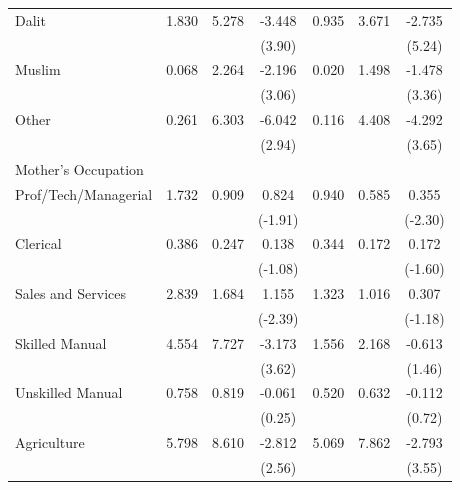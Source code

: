 \begin{longtable}{@{}l*{6}{c}@{}}
\hspace{1em}Dalit & 1.830 & 5.278 & -3.448\sym{***} & 0.935 & 3.671 & -2.735\sym{***} \\
                    &         &         & (3.90) &         &         & (5.24) \\
\hspace{1em}Muslim & 0.068 & 2.264 & -2.196\sym{***} & 0.020 & 1.498 & -1.478\sym{***} \\
                    &         &         & (3.06) &         &         & (3.36) \\
\hspace{1em}Other & 0.261 & 6.303 & -6.042\sym{***} & 0.116 & 4.408 & -4.292\sym{***} \\
                    &         &         & (2.94) &         &         & (3.65) \\
\multicolumn{7}{l}{Mother's Occupation} \\
\hspace{1em}Prof/Tech/Managerial & 1.732 & 0.909 & 0.824\sym{*} & 0.940 & 0.585 & 0.355\sym{**} \\
                    &         &         & (-1.91) &         &         & (-2.30) \\
\hspace{1em}Clerical & 0.386 & 0.247 & 0.138 & 0.344 & 0.172 & 0.172 \\
                    &         &         & (-1.08) &         &         & (-1.60) \\
\hspace{1em}Sales and Services & 2.839 & 1.684 & 1.155\sym{**} & 1.323 & 1.016 & 0.307 \\
                    &         &         & (-2.39) &         &         & (-1.18) \\
\hspace{1em}Skilled Manual & 4.554 & 7.727 & -3.173\sym{***} & 1.556 & 2.168 & -0.613 \\
                    &         &         & (3.62) &         &         & (1.46) \\
\hspace{1em}Unskilled Manual & 0.758 & 0.819 & -0.061 & 0.520 & 0.632 & -0.112 \\
                    &         &         & (0.25) &         &         & (0.72) \\
\hspace{1em}Agriculture & 5.798 & 8.610 & -2.812\sym{**} & 5.069 & 7.862 & -2.793\sym{***} \\
                    &         &         & (2.56) &         &         & (3.55) \\

\end{longtable}
